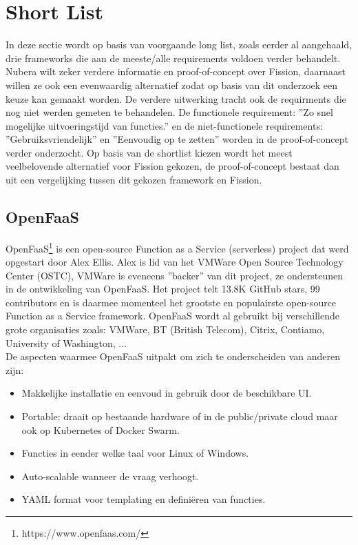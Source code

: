\section{Short List}
\label{sec:short-list}

In deze sectie wordt op basis van voorgaande long list, zoals eerder al aangehaald, drie frameworks die aan de meeste/alle requirements voldoen verder behandelt. Nubera wilt zeker verdere informatie en proof-of-concept over Fission, daarnaast willen ze ook een evenwaardig alternatief zodat op basis van dit onderzoek een keuze kan gemaakt worden. De verdere uitwerking tracht ook de requirments die nog niet werden gemeten te behandelen. De functionele requirement: ''Zo snel mogelijke uitvoeringstijd van functies.'' en de niet-functionele requirements: ''Gebruiksvriendelijk'' en ''Eenvoudig op te zetten'' worden in de proof-of-concept verder onderzocht. Op basis van de shortlist kiezen wordt het meest veelbelovende alternatief voor Fission gekozen, de proof-of-concept bestaat dan uit een vergelijking tussen dit gekozen framework en Fission.


\subsection{OpenFaaS}
OpenFaaS\footnote{https://www.openfaas.com/} is een open-source Function as a Service (serverless) project dat werd opgestart door Alex Ellis. Alex is lid van het VMWare Open Source Technology Center (OSTC), VMWare is eveneens ''backer'' van dit project, ze ondersteunen in de ontwikkeling van OpenFaaS. Het project telt 13.8K GitHub stars, 99 contributors en is daarmee momenteel het grootste en populairste open-source Function as a Service framework. OpenFaaS wordt al gebruikt bij verschillende grote organisaties zoals: VMWare, BT (British Telecom), Citrix, Contiamo, University of Washington, ... 
\\
De aspecten waarmee OpenFaaS uitpakt om zich te onderscheiden van anderen zijn:
\begin{itemize}
    \item Makkelijke installatie en eenvoud in gebruik door de beschikbare UI.
    \item Portable: draait op bestaande hardware of in de public/private cloud maar ook op Kubernetes of Docker Swarm.
    \item Functies in eender welke taal voor Linux of Windows.
    \item Auto-scalable wanneer de vraag verhoogt.
    \item YAML format voor templating en definiëren van functies.
\end{itemize}
